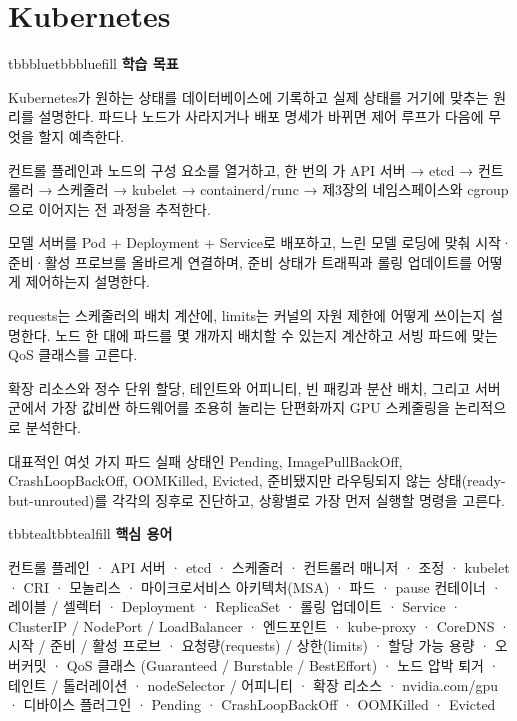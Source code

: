 \setcounter{chapter}{4}
\chapter{Kubernetes}

\begin{calloutbox}{tbbblue}{tbbbluefill}
{\normalsize\bfseries\color{tbbblue}학습 목표}\par\vspace{3pt}
\begin{tbbitemize}
  \item Kubernetes가 원하는 상태를 데이터베이스에 기록하고 실제 상태를 거기에 맞추는 원리를 설명한다. 파드나 노드가 사라지거나 배포 명세가 바뀌면 제어 루프가 다음에 무엇을 할지 예측한다.
  \item 컨트롤 플레인과 노드의 구성 요소를 열거하고, 한 번의 가 API 서버 → etcd → 컨트롤러 → 스케줄러 → kubelet → containerd/runc → 제3장의 네임스페이스와 cgroup으로 이어지는 전 과정을 추적한다.
  \item 모델 서버를 Pod + Deployment + Service로 배포하고, 느린 모델 로딩에 맞춰 시작·준비·활성 프로브를 올바르게 연결하며, 준비 상태가 트래픽과 롤링 업데이트를 어떻게 제어하는지 설명한다.
  \item requests는 스케줄러의 배치 계산에, limits는 커널의 자원 제한에 어떻게 쓰이는지 설명한다. 노드 한 대에 파드를 몇 개까지 배치할 수 있는지 계산하고 서빙 파드에 맞는 QoS 클래스를 고른다.
  \item 확장 리소스와 정수 단위 할당, 테인트와 어피니티, 빈 패킹과 분산 배치, 그리고 서버군에서 가장 값비싼 하드웨어를 조용히 놀리는 단편화까지 GPU 스케줄링을 논리적으로 분석한다.
  \item 대표적인 여섯 가지 파드 실패 상태인 Pending, ImagePullBackOff, CrashLoopBackOff, OOMKilled, Evicted, 준비됐지만 라우팅되지 않는 상태(ready-but-unrouted)를 각각의 징후로 진단하고, 상황별로 가장 먼저 실행할 명령을 고른다.
\end{tbbitemize}
\end{calloutbox}

\vspace{5.0pt}

\begin{calloutbox}{tbbteal}{tbbtealfill}
{\normalsize\bfseries\color{tbbteal}핵심 용어}\par\vspace{3pt}
컨트롤 플레인 · API 서버 · etcd · 스케줄러 · 컨트롤러 매니저 · 조정 · kubelet · CRI · 모놀리스 · 마이크로서비스 아키텍처(MSA) · 파드 · pause 컨테이너 · 레이블 / 셀렉터 · Deployment · ReplicaSet · 롤링 업데이트 · Service · ClusterIP / NodePort / LoadBalancer · 엔드포인트 · kube-proxy · CoreDNS · 시작 / 준비 / 활성 프로브 · 요청량(requests) / 상한(limits) · 할당 가능 용량 · 오버커밋 · QoS 클래스 (Guaranteed / Burstable / BestEffort) · 노드 압박 퇴거 · 테인트 / 톨러레이션 · nodeSelector / 어피니티 · 확장 리소스 · nvidia.com/gpu · 디바이스 플러그인 · Pending · CrashLoopBackOff · OOMKilled · Evicted
\end{calloutbox}

